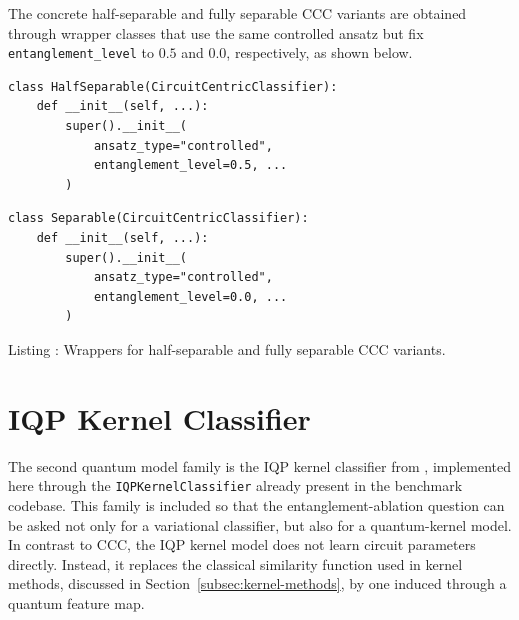 \documentclass[12pt,a4paper,openany]{report}
\let\textcite\citet
\begin{document}
The concrete half-separable and fully separable CCC variants are obtained through wrapper classes that use the same controlled ansatz but fix \texttt{entanglement\_level} to \(0.5\) and \(0.0\), respectively, as shown below.
\noindent\begin{minipage}{\textwidth}
\centering

\begin{minipage}{0.48\textwidth}
\begin{lstlisting}[style=pythonstyle, basicstyle=\ttfamily\scriptsize, numbers=none]
class HalfSeparable(CircuitCentricClassifier):
    def __init__(self, ...):
        super().__init__(
            ansatz_type="controlled",
            entanglement_level=0.5, ...
        )
\end{lstlisting}
\end{minipage}
\hfill
\begin{minipage}{0.48\textwidth}
\begin{lstlisting}[style=pythonstyle, basicstyle=\ttfamily\scriptsize, numbers=none]
class Separable(CircuitCentricClassifier):
    def __init__(self, ...):
        super().__init__(
            ansatz_type="controlled",
            entanglement_level=0.0, ...
        )
\end{lstlisting}
\end{minipage}

\label{lst:ccc-wrapper-minimal}
\par\smallskip
{\small Listing \thelstlisting: Wrappers for half-separable and fully separable CCC variants.\par}
\end{minipage}

\section{IQP Kernel Classifier}

The second quantum model family is the IQP kernel classifier from \textcite{havlicek2019supervised}, implemented here through the \texttt{IQPKernelClassifier} already present in the benchmark codebase. This family is included so that the entanglement-ablation question can be asked not only for a variational classifier, but also for a quantum-kernel model. In contrast to CCC, the IQP kernel model does not learn circuit parameters directly. Instead, it replaces the classical similarity function used in kernel methods, discussed in Section~\ref{subsec:kernel-methods}, by one induced through a quantum feature map.
\end{document}
